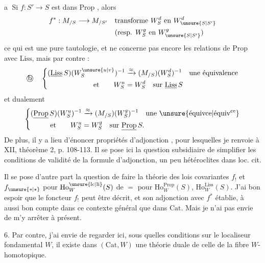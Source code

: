 \textcircled{a} Si $f:S'\to S$ est dans $\mathrm{Prop}$ , alors
\[
\begin{aligned}
f^*:M_{/S}\longrightarrow M_{/S'}\quad &\text{transforme }W_S^d\text{ en }W_{\unsure{S|S'}}^d\\
&(\text{resp. } W_S^g\text{ en }W_{\unsure{S|S'}}^g)
\end{aligned}
\]
ce qui est une pure tautologie, et ne concerne pas encore les relations de $\mathrm{Prop}$ avec $\mathrm{Liss}$, mais par contre :
\[
\text{\textcircled{b}}\quad
\left\{\begin{aligned}
(\underline{\mathrm{Liss}}\,S)(W_S^{\unsure{u|v}})^{-1}&\xrightarrow{\approx}(M_{/S})(W_S^d)^{-1}
\quad\text{une équivalence}\\
\text{et}\qquad W_S^u&=W_S^d\quad\text{sur }\underline{\mathrm{Liss}}\,S
\end{aligned}\right.
\]
et dualement
\[
\left\{\begin{aligned}
(\underline{\mathrm{Prop}}\,S)(W_S^u)^{-1}&\xrightarrow{\approx}(M_{/S})(W_S^g)^{-1}
\quad\text{une \unsure{équivce|équiv\textsuperscript{ce}}}\\
\text{et}\qquad W_S^u&=W_S^g\quad\text{sur }\underline{\mathrm{Prop}}\,S.
\end{aligned}\right.
\]
De plus, il y a lieu d'énoncer    propriétés d'adjonction , pour lesquelles je renvoie à XII, théorème  2, p. 108-113. Il se pose ici la question subsidiaire de simplifier les conditions de validité de la formule d'adjonction, un peu hétéroclites dans loc. cit.

Il se pose  d'autre part la question de faire la théorie des  lois covariantes $f_!$ et $f_{\unsure{*|\star}}$ pour $\mathrm{Ho}^{\unsure{\mathrm{lc}|\mathrm{li}}}_W(S)$ de $=$ pour $\mathrm{Ho}^{\mathrm{Prop}}_W(S)$, $\mathrm{Ho}^{\mathrm{Liss}}_W(S)$.
J'ai bon espoir que  le foncteur $f_!$ peut être décrit, et son adjonction avec $f^*$ établie, à aussi bon compte dans ce contexte général que dans $\mathrm{Cat}$. Mais je n'ai pas envie de m'y arrêter à présent.

6. 
Par contre, j'ai envie de regarder ici,  sous quelles conditions sur le localiseur fondamental $W$, il existe dans $(\mathrm{Cat},W)$ une théorie duale de celle de la fibre $W$-homotopique.


